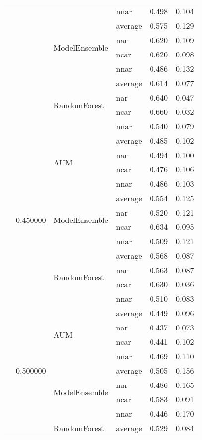 \begin{longtable}{llllrr}
 &  &  & nnar & 0.498 & 0.104 \\
\cline{3-6}
 &  & \multirow[t]{4}{*}{ModelEnsemble} & average & 0.575 & 0.129 \\
 &  &  & nar & 0.620 & 0.109 \\
 &  &  & ncar & 0.620 & 0.098 \\
 &  &  & nnar & 0.486 & 0.132 \\
\cline{3-6}
 &  & \multirow[t]{4}{*}{RandomForest} & average & 0.614 & 0.077 \\
 &  &  & nar & 0.640 & 0.047 \\
 &  &  & ncar & 0.660 & 0.032 \\
 &  &  & nnar & 0.540 & 0.079 \\
\cline{2-6} \cline{3-6}
 & \multirow[t]{12}{*}{0.450000} & \multirow[t]{4}{*}{AUM} & average & 0.485 & 0.102 \\
 &  &  & nar & 0.494 & 0.100 \\
 &  &  & ncar & 0.476 & 0.106 \\
 &  &  & nnar & 0.486 & 0.103 \\
\cline{3-6}
 &  & \multirow[t]{4}{*}{ModelEnsemble} & average & 0.554 & 0.125 \\
 &  &  & nar & 0.520 & 0.121 \\
 &  &  & ncar & 0.634 & 0.095 \\
 &  &  & nnar & 0.509 & 0.121 \\
\cline{3-6}
 &  & \multirow[t]{4}{*}{RandomForest} & average & 0.568 & 0.087 \\
 &  &  & nar & 0.563 & 0.087 \\
 &  &  & ncar & 0.630 & 0.036 \\
 &  &  & nnar & 0.510 & 0.083 \\
\cline{2-6} \cline{3-6}
 & \multirow[t]{12}{*}{0.500000} & \multirow[t]{4}{*}{AUM} & average & 0.449 & 0.096 \\
 &  &  & nar & 0.437 & 0.073 \\
 &  &  & ncar & 0.441 & 0.102 \\
 &  &  & nnar & 0.469 & 0.110 \\
\cline{3-6}
 &  & \multirow[t]{4}{*}{ModelEnsemble} & average & 0.505 & 0.156 \\
 &  &  & nar & 0.486 & 0.165 \\
 &  &  & ncar & 0.583 & 0.091 \\
 &  &  & nnar & 0.446 & 0.170 \\
\cline{3-6}
 &  & \multirow[t]{4}{*}{RandomForest} & average & 0.529 & 0.084 \\

\end{longtable}
